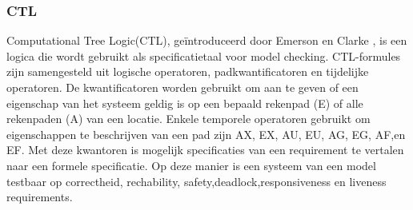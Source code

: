 \documentclass{article}
\begin{document}
		\subsubsection{CTL}
	
	Computational Tree Logic(CTL), geïntroduceerd door Emerson en Clarke  , is een   logica die wordt gebruikt als specificatietaal voor model checking.  
	CTL-formules zijn samengesteld uit logische operatoren, padkwantificatoren en 	tijdelijke operatoren. De kwantificatoren worden gebruikt om aan te geven of een eigenschap van het systeem geldig is op een bepaald rekenpad (E) of alle rekenpaden (A) van
	een locatie. Enkele temporele operatoren gebruikt om eigenschappen te beschrijven van een pad zijn AX, EX, AU, EU, AG, EG, AF,en EF. Met deze kwantoren is  mogelijk specificaties van een requirement te vertalen naar een formele specificatie. Op deze manier is een systeem van een model testbaar op correctheid, rechability, safety,deadlock,responsiveness en liveness requirements. 
%	
%




\end{document}
